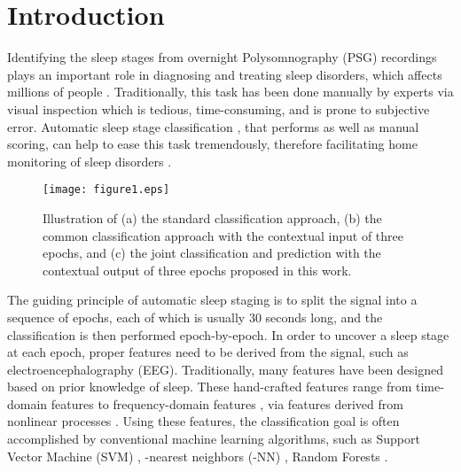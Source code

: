 \documentclass[10pt,twocolumn,twoside]{IEEEtran}
\makeatletter
\def\blfootnote{\xdef\@thefnmark{}\@footnotetext}
\makeatother
\begin{document}
\IEEEpeerreviewmaketitle

\section{Introduction}
\label{sec:intro}

\blfootnote{\footnotesize DOI: 10.1109/TBME.2018.2872652}
Identifying the sleep stages from overnight Polysomnography (PSG) recordings plays an important role in diagnosing and treating sleep disorders, which affects millions of people \cite{Krieger2017,Redmond2006}.
Traditionally, this task has been done manually by experts via visual inspection which is tedious, time-consuming, and is prone to subjective error. Automatic sleep stage classification \cite{Aboalayon2016}, that performs as well as manual scoring, can help to ease this task tremendously, therefore facilitating home monitoring of sleep disorders \cite{Kelly2012}.

\begin{figure} [!t]
	\centering
	\texttt{[image: figure1.eps]}
	\vspace{0.2cm}
	\caption{Illustration of (a) the standard classification approach, (b) the common classification approach with the contextual input of three epochs, and (c) the joint classification and prediction with the contextual output of three epochs proposed in this work.}
	\label{fig:contextualinput_vs_output}
\end{figure}

The guiding principle of automatic sleep staging is to split the signal into a sequence of epochs, each of which is usually 30 seconds long, and the classification is then performed epoch-by-epoch. 
In order to uncover a sleep stage at each epoch, proper features need to be derived from the signal, such as electroencephalography (EEG). Traditionally, many features have been designed based on prior knowledge of sleep. These hand-crafted features range from time-domain features \cite{Krakovska2011, Koley2012, Redmond2006} to frequency-domain features \cite{Phan2013, Susmakova2008, Koley2012, Fell1996}, via features derived from nonlinear processes \cite{Kim2000, Lee2012, Susmakova2008, Zhang2001}. Using these features, the classification goal is often accomplished by conventional machine learning algorithms, such as Support Vector Machine (SVM) \cite{Alickovic2018,Koley2012}, -nearest neighbors (-NN) \cite{Phan2013}, Random Forests \cite{Memar2018, Boostania2017,Imtiaz2015b}.
\end{document}
